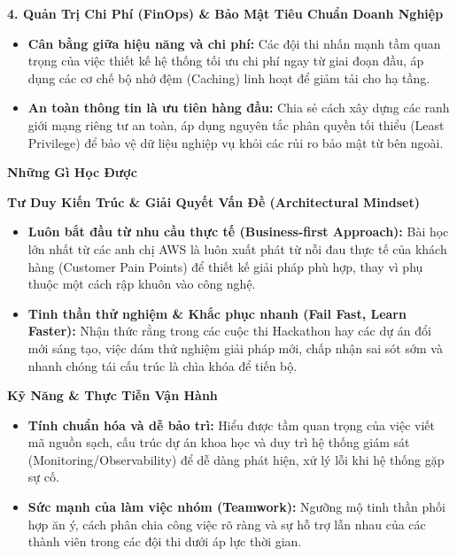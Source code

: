 \vspace{0.5em}\noindent\textbf{4. Quản Trị Chi Phí (FinOps) \& Bảo Mật Tiêu Chuẩn Doanh
Nghiệp}

\begin{itemize}
\tightlist
\item
  \textbf{Cân bằng giữa hiệu năng và chi phí:} Các đội thi nhấn mạnh tầm
  quan trọng của việc thiết kế hệ thống tối ưu chi phí ngay từ giai đoạn
  đầu, áp dụng các cơ chế bộ nhớ đệm (Caching) linh hoạt để giảm tải cho
  hạ tầng.
\item
  \textbf{An toàn thông tin là ưu tiên hàng đầu:} Chia sẻ cách xây dựng
  các ranh giới mạng riêng tư an toàn, áp dụng nguyên tắc phân quyền tối
  thiểu (Least Privilege) để bảo vệ dữ liệu nghiệp vụ khỏi các rủi ro
  bảo mật từ bên ngoài.
\end{itemize}

\vspace{0.5em}\noindent\textbf{Những Gì Học Được}

\vspace{0.5em}\noindent\textbf{Tư Duy Kiến Trúc \& Giải Quyết Vấn Đề (Architectural
Mindset)}

\begin{itemize}
\tightlist
\item
  \textbf{Luôn bắt đầu từ nhu cầu thực tế (Business-first Approach):}
  Bài học lớn nhất từ các anh chị AWS là luôn xuất phát từ nỗi đau thực
  tế của khách hàng (Customer Pain Points) để thiết kế giải pháp phù
  hợp, thay vì phụ thuộc một cách rập khuôn vào công nghệ.
\item
  \textbf{Tinh thần thử nghiệm \& Khắc phục nhanh (Fail Fast, Learn
  Faster):} Nhận thức rằng trong các cuộc thi Hackathon hay các dự án
  đổi mới sáng tạo, việc dám thử nghiệm giải pháp mới, chấp nhận sai sót
  sớm và nhanh chóng tái cấu trúc là chìa khóa để tiến bộ.
\end{itemize}

\vspace{0.5em}\noindent\textbf{Kỹ Năng \& Thực Tiễn Vận Hành}

\begin{itemize}
\tightlist
\item
  \textbf{Tính chuẩn hóa và dễ bảo trì:} Hiểu được tầm quan trọng của
  việc viết mã nguồn sạch, cấu trúc dự án khoa học và duy trì hệ thống
  giám sát (Monitoring/Observability) để dễ dàng phát hiện, xử lý lỗi
  khi hệ thống gặp sự cố.
\item
  \textbf{Sức mạnh của làm việc nhóm (Teamwork):} Ngưỡng mộ tinh thần
  phối hợp ăn ý, cách phân chia công việc rõ ràng và sự hỗ trợ lẫn nhau
  của các thành viên trong các đội thi dưới áp lực thời gian.
\end{itemize}

